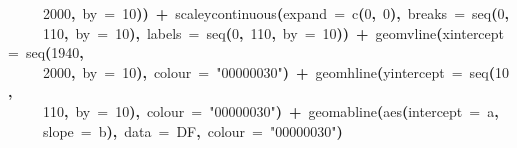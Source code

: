 \documentclass[a4paper]{article}
\newcommand{\hlnumber}[1]{\textcolor[rgb]{0.0823529411764706,0.0784313725490196,0.709803921568627}{#1}}%
\newcommand{\hlfunctioncall}[1]{\textcolor[rgb]{1,0,0}{#1}}%
\newcommand{\hlstring}[1]{\textcolor[rgb]{0.6,0.6,1}{#1}}%
\newcommand{\hlkeyword}[1]{\textcolor[rgb]{0,0,0}{\textbf{#1}}}%
\newcommand{\hlargument}[1]{\textcolor[rgb]{0.694117647058824,0.247058823529412,0.0196078431372549}{#1}}%
\newcommand{\hlsymbol}[1]{\textcolor[rgb]{0,0,0}{#1}}%
\newcommand{\hlprompt}[1]{\textcolor[rgb]{0,0,0}{#1}}%
\newcommand{\hlstd}[1]{\textcolor[rgb]{0,0,0}{#1}}%
\newenvironment{Houtput}{\raggedright}{%
%
}
\begin{document}
\begin{Houtput}
\hlstd{}\hlprompt{{\ }}{\ }{\ }{\ }{\ }\hlnumber{2000}\hlkeyword{,}{\ }\hlargument{by}{\ }\hlargument{=}{\ }\hlnumber{10}\hlkeyword{)}\hlkeyword{)}{\ }\hlkeyword{+}{\ }\hlfunctioncall{scale\usebox{\hlnormalsizeboxunderscore}y\usebox{\hlnormalsizeboxunderscore}continuous}\hlkeyword{(}\hlargument{expand}{\ }\hlargument{=}{\ }\hlfunctioncall{c}\hlkeyword{(}\hlnumber{0}\hlkeyword{,}{\ }\hlnumber{0}\hlkeyword{)}\hlkeyword{,}{\ }\hlargument{breaks}{\ }\hlargument{=}{\ }\hlfunctioncall{seq}\hlkeyword{(}\hlnumber{0}\hlkeyword{,}\hspace*{\fill}\\
\hlstd{}\hlprompt{{\ }}{\ }{\ }{\ }{\ }\hlnumber{110}\hlkeyword{,}{\ }\hlargument{by}{\ }\hlargument{=}{\ }\hlnumber{10}\hlkeyword{)}\hlkeyword{,}{\ }\hlargument{labels}{\ }\hlargument{=}{\ }\hlfunctioncall{seq}\hlkeyword{(}\hlnumber{0}\hlkeyword{,}{\ }\hlnumber{110}\hlkeyword{,}{\ }\hlargument{by}{\ }\hlargument{=}{\ }\hlnumber{10}\hlkeyword{)}\hlkeyword{)}{\ }\hlkeyword{+}{\ }\hlfunctioncall{geom\usebox{\hlnormalsizeboxunderscore}vline}\hlkeyword{(}\hlargument{xintercept}{\ }\hlargument{=}{\ }\hlfunctioncall{seq}\hlkeyword{(}\hlnumber{1940}\hlkeyword{,}\hspace*{\fill}\\
\hlstd{}\hlprompt{{\ }}{\ }{\ }{\ }{\ }\hlnumber{2000}\hlkeyword{,}{\ }\hlargument{by}{\ }\hlargument{=}{\ }\hlnumber{10}\hlkeyword{)}\hlkeyword{,}{\ }\hlargument{colour}{\ }\hlargument{=}{\ }\hlstring{"\usebox{\hlnormalsizeboxhash}00000030"}\hlkeyword{)}{\ }\hlkeyword{+}{\ }\hlfunctioncall{geom\usebox{\hlnormalsizeboxunderscore}hline}\hlkeyword{(}\hlargument{yintercept}{\ }\hlargument{=}{\ }\hlfunctioncall{seq}\hlkeyword{(}\hlnumber{10}\hlkeyword{,}\hspace*{\fill}\\
\hlstd{}\hlprompt{{\ }}{\ }{\ }{\ }{\ }\hlnumber{110}\hlkeyword{,}{\ }\hlargument{by}{\ }\hlargument{=}{\ }\hlnumber{10}\hlkeyword{)}\hlkeyword{,}{\ }\hlargument{colour}{\ }\hlargument{=}{\ }\hlstring{"\usebox{\hlnormalsizeboxhash}00000030"}\hlkeyword{)}{\ }\hlkeyword{+}{\ }\hlfunctioncall{geom\usebox{\hlnormalsizeboxunderscore}abline}\hlkeyword{(}\hlfunctioncall{aes}\hlkeyword{(}\hlargument{intercept}{\ }\hlargument{=}{\ }\hlsymbol{a}\hlkeyword{,}\hspace*{\fill}\\
\hlstd{}\hlprompt{{\ }}{\ }{\ }{\ }{\ }\hlargument{slope}{\ }\hlargument{=}{\ }\hlsymbol{b}\hlkeyword{)}\hlkeyword{,}{\ }\hlargument{data}{\ }\hlargument{=}{\ }\hlsymbol{DF}\hlkeyword{,}{\ }\hlargument{colour}{\ }\hlargument{=}{\ }\hlstring{"\usebox{\hlnormalsizeboxhash}00000030"}\hlkeyword{)}\mbox{}
\normalfont
\hspace*{\fill}\\
\hlstd{}
\end{Houtput}
\end{document}
